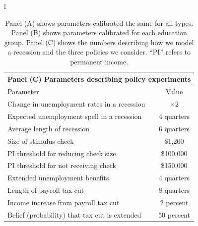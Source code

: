 \documentclass[../HAFiscal]{subfiles}
\begin{document}
\begin{table}[p]
\begin{center}
\begin{tabular}{l}
\begin{tabular}{lc}
	\toprule 
	\multicolumn{2}{l}{Panel (C) Parameters describing policy experiments} \\ \midrule 
	Parameter & Value \\ \midrule 
	Change in unemployment rates in a recession & $\times 2$ \\ 
	Expected unemployment spell in a recession & 4 quarters \\ 
	Average length of recession & 6 quarters \\ 
	Size of stimulus check & \$1,200 \\ 
	PI threshold for reducing check size & \$100,000 \\ 
	PI threshold for not receiving check & \$150,000 \\ 
	Extended unemployment benefits & 4 quarters \\
	Length of payroll tax cut & 8 quarters \\ 
	Income increase from payroll tax cut & 2 percent \\ 
	Belief (probability) that tax cut is extended & 50 percent 		
	\\ \bottomrule
\end{tabular} 

\end{tabular}
\end{center}
\caption{Panel (A) shows parameters calibrated the same for all types. Panel (B) shows parameters calibrated for each education group. Panel (C) shows the numbers describing how we model a recession and the three policies we consider. ``PI'' refers to permanent income.}
\label{tab:calibration}
\end{table}
\end{document}
